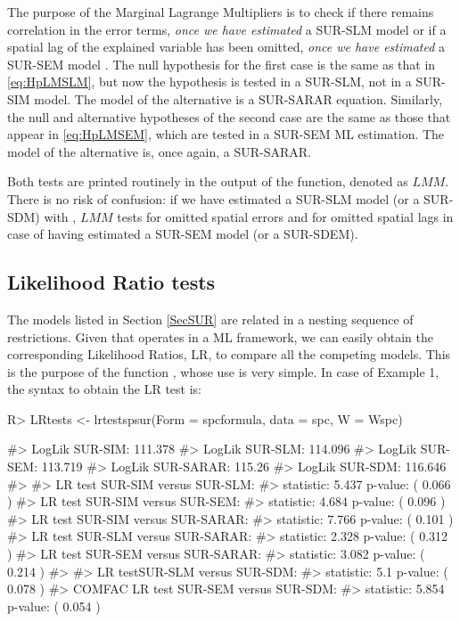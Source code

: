 \documentclass[article]{jss}
\begin{document}
The purpose of the Marginal Lagrange Multipliers is to check if there remains correlation in the error terms, \emph{once we have estimated} a SUR-SLM model or if a spatial lag of the explained variable has been omitted, \emph{once we have estimated} a SUR-SEM model \citep{anselinbera1998}. The null hypothesis for the first case is the same as that in \eqref{eq:HpLMSLM}, but now the hypothesis is tested in a SUR-SLM, not in a SUR-SIM model. The model of the alternative is a SUR-SARAR equation. Similarly, the null and alternative hypotheses of the second case are the same as those that appear in \eqref{eq:HpLMSEM}, which are tested in a SUR-SEM ML estimation. The model of the alternative is, once again, a SUR-SARAR.

Both tests are printed routinely in the output of the  function, denoted as \(LMM\). There is no risk of confusion: if we have estimated a SUR-SLM model (or a SUR-SDM) with , \(LMM\) tests for omitted spatial errors and for omitted spatial lags in case of having estimated a SUR-SEM model (or a SUR-SDEM).

\hypertarget{LRtests}{%
\subsection{Likelihood Ratio tests}\label{LRtests}}

The models listed in Section \ref{SecSUR} are related in a nesting sequence of restrictions. Given that  operates in a ML framework, we can easily obtain the corresponding Likelihood Ratios, LR, to compare all the competing models. This is the purpose of the function , whose use is very simple. In case of Example 1, the syntax to obtain the LR test is:

\begin{CodeChunk}

\begin{CodeInput}
R> LRtests <- lrtestspsur(Form = spcformula, data = spc, W = Wspc)
\end{CodeInput}

\begin{CodeOutput}
#> LogLik SUR-SIM:   111.378 
#> LogLik SUR-SLM:   114.096 
#> LogLik SUR-SEM:   113.719 
#> LogLik SUR-SARAR:  115.26 
#> LogLik SUR-SDM:   116.646 
#> 
#>  LR test SUR-SIM versus SUR-SLM: 
#> statistic:  5.437  p-value: ( 0.066 ) 
#>  LR test SUR-SIM versus SUR-SEM: 
#> statistic:  4.684  p-value: ( 0.096 ) 
#>  LR test SUR-SIM versus SUR-SARAR: 
#> statistic:  7.766  p-value: ( 0.101 ) 
#>  LR test SUR-SLM versus SUR-SARAR: 
#> statistic:  2.328  p-value: ( 0.312 ) 
#>  LR test SUR-SEM versus SUR-SARAR: 
#> statistic:  3.082  p-value: ( 0.214 ) 
#> 
#>  LR testSUR-SLM versus SUR-SDM: 
#> statistic:  5.1  p-value: ( 0.078 ) 
#>  COMFAC LR test SUR-SEM versus SUR-SDM: 
#> statistic:  5.854  p-value: ( 0.054 )
\end{CodeOutput}
\end{CodeChunk}
\end{document}
